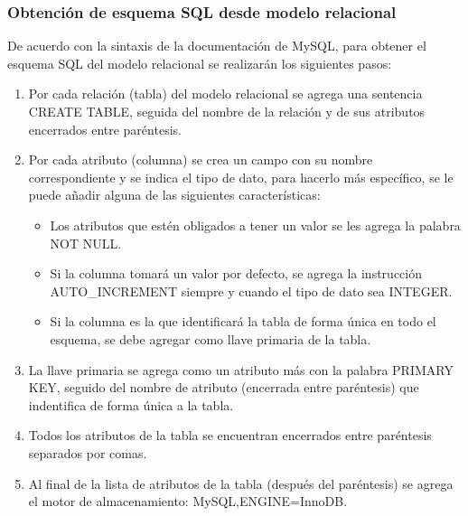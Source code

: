 \subsubsection{Obtención de esquema SQL desde modelo relacional}


De acuerdo con la sintaxis de la documentación de MySQL\cite{mysql_mysql_2020}, para obtener el esquema SQL del modelo relacional se realizarán los siguientes pasos:

\begin{enumerate}
  \item Por cada relación (tabla) del modelo relacional se agrega una sentencia CREATE TABLE, seguida del nombre de la relación y de sus atributos encerrados entre paréntesis.
  \item Por cada atributo (columna) se crea un campo con su nombre correspondiente y se indica el tipo de dato, para hacerlo más específico, se le puede añadir alguna de las siguientes características:
  \begin{itemize}
    \item Los atributos que estén obligados a tener un valor se les agrega la palabra NOT NULL.
    \item Si la columna tomará un valor por defecto, se agrega la instrucción AUTO\_INCREMENT siempre y cuando el tipo de dato sea INTEGER.
    \item Si la columna es la que identificará la tabla de forma única en todo el esquema, se debe agregar como llave primaria de la tabla.
  \end{itemize}
  \item La llave primaria se agrega como un atributo más con la palabra PRIMARY KEY, seguido del nombre de atributo (encerrada entre paréntesis) que indentifica de forma única a la tabla.
  \item Todos los atributos de la tabla se encuentran encerrados entre paréntesis separados por comas.
  \item Al final de la lista de atributos de la tabla (después del paréntesis) se agrega el motor de almacenamiento: MySQL,ENGINE=InnoDB.
\end{enumerate}
